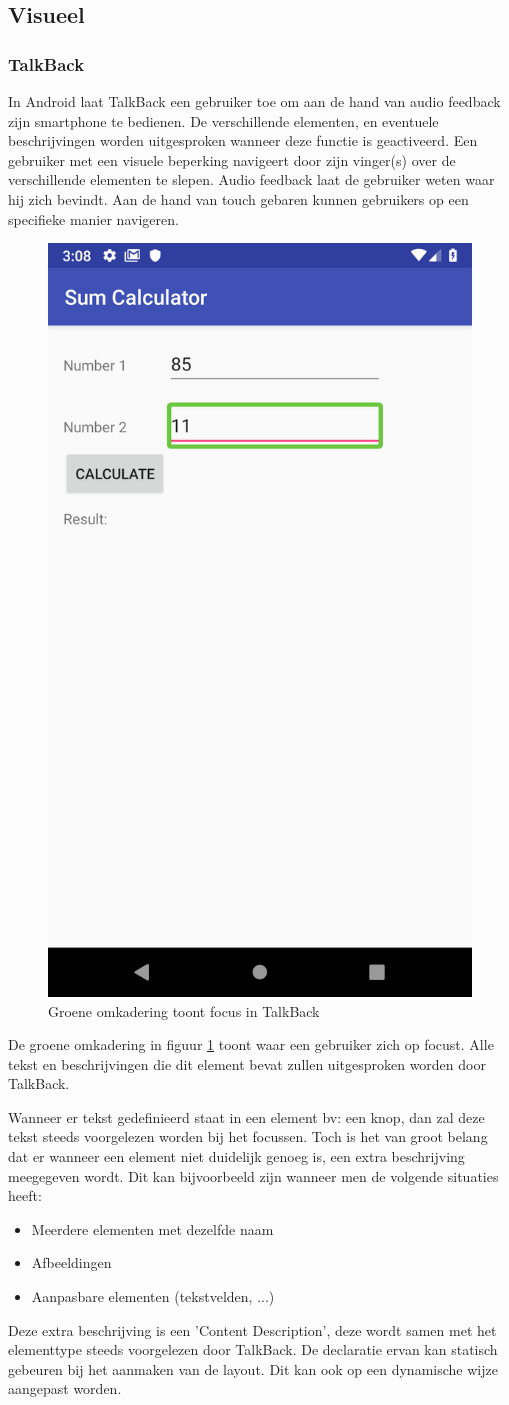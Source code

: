 \subsection{Visueel}
\subsubsection{TalkBack}
\label{subsec:TalkBack}
In Android laat TalkBack een gebruiker toe om aan de hand van audio feedback zijn smartphone te bedienen. De verschillende elementen, en eventuele beschrijvingen worden uitgesproken wanneer deze functie is geactiveerd. Een gebruiker met een visuele beperking navigeert door zijn vinger(s) over de verschillende elementen te slepen. Audio feedback laat de gebruiker weten waar hij zich bevindt. Aan de hand van touch gebaren kunnen gebruikers op een specifieke manier navigeren.

\begin{figure}[h]
    \centering
    \includegraphics[width=0.4\linewidth]{img/talkback_focus}
    \caption{Groene omkadering toont focus in TalkBack }
    \label{fig:talkbackfocus}
\end{figure}

De groene omkadering in figuur \ref{fig:talkbackfocus} toont waar een gebruiker zich op focust. Alle tekst en beschrijvingen die dit element bevat zullen uitgesproken worden door TalkBack.

Wanneer er tekst gedefinieerd staat in een element bv: een knop, dan zal deze tekst steeds voorgelezen worden bij het focussen. Toch is het van groot belang dat er wanneer een element niet duidelijk genoeg is, een extra beschrijving meegegeven wordt. Dit kan bijvoorbeeld zijn wanneer men de volgende situaties heeft: 
\begin{itemize}
    \item Meerdere elementen met dezelfde naam
     \item Afbeeldingen
       \item Aanpasbare elementen (tekstvelden, ...)
\end{itemize}
Deze extra beschrijving is een 'Content Description', deze wordt samen met het elementtype steeds voorgelezen door TalkBack. 
De declaratie ervan kan statisch gebeuren bij het aanmaken van de layout. Dit kan ook op een dynamische wijze aangepast worden.



